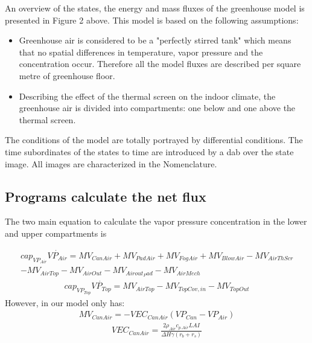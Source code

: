 \indent An overview of the states, the energy and mass fluxes of the greenhouse model is presented in Figure 2 above. This model is based on the following assumptions:
\begin{itemize}
    \item Greenhouse air is considered to be a "perfectly stirred tank" which means that no spatial differences in temperature, vapor pressure and the  concentration occur. Therefore all the model fluxes are described per square metre of greenhouse floor.
    \item Describing the effect of the thermal screen on the indoor climate, the greenhouse air is divided into compartments: one below and one above the thermal screen.
\end{itemize}
\indent The conditions of the model are totally portrayed by differential conditions. The time subordinates of the states to time are introduced by a dab over the state image. All images are characterized in the Nomenclature.
\subsection{Programs calculate the net  flux}
The two main equation to calculate the vapor pressure concentration in the lower and upper compartments is

\begin{equation}
\begin{array}{r}
cap_{VP_{Air}}\Dot{VP_{Air}}=MV_{CanAir}+MV_{PadAir}+MV_{FogAir}+MV_{BlowAir}-MV_{AirThScr} \\
-MV_{AirTop}-MV_{AirOut}-MV_{Airout_Pad}-MV_{AirMech}
\end{array}
\end{equation}
\begin{equation}
\begin{array}{r}
cap_{VP_{Top}}\Dot{VP_{Top}}=MV_{AirTop}-MV_{TopCov,in}-MV_{TopOut}
\end{array}
\end{equation}
However, in our model only has:
\begin{equation}
\begin{array}{r}
MV_{CanAir}=-VEC_{CanAir}(VP_{Can}-VP_{Air})
\end{array}
\end{equation}
\begin{equation}
\begin{array}{r}
VEC_{CanAir}=\frac{2\rho_{Air}c_{p.Air}LAI}{\Delta H\gamma (r_{b}+r_{s})}
\end{array}
\end{equation}

